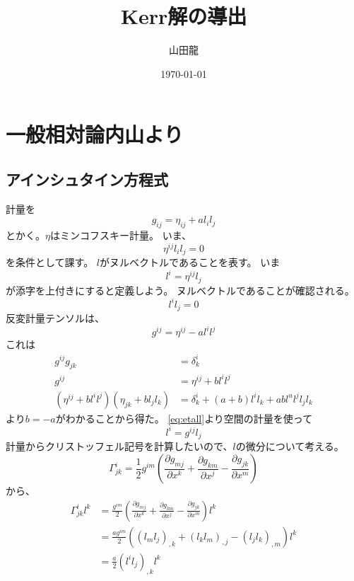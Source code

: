 \documentclass[twocolumn]{jsarticle}
\date{\today}
\author{山田龍}
\title{Kerr解の導出}
\newcommand{\pder}[2][]{\frac{\partial#1}{\partial#2}}
\newcommand{\pderx}[2][]{\pder[#1]{x^{#2}}}
\newcommand{\pdergx}[2][]{\pderx[g_{#1}]{#2}}
\newcommand{\half}{\frac{1}{2}}
\newcommand{\beq}{\begin{equation}}
\newcommand{\eeq}{\end{equation}}
\newcommand{\GaT}[3]{\Gamma^{#1}_{#2 #3}}
\newcommand{\Christfinside}[3]{\pdergx[#3 #1]{#2} + \pdergx[#2 #3]{#1} - \pdergx[#1 #2]{#3}}
\newcommand{\Christf}[4]{\Gamma^{#1}_{#2 #3}=\half g^{#1 #4}(\Christfinside{#2}{#3}{#4})}
\begin{document}
\maketitle
\section{一般相対論内山より}
\subsection{アインシュタイン方程式}
計量を
\beq
g_{ij} = \eta_{ij} + al_il_j
\eeq
とかく。$\eta$はミンコフスキー計量。
いま、
\beq\label{eq:etall}
    \eta^{ij} l_il_j = 0
\eeq
を条件として課す。
$l$がヌルベクトルであることを表す。
いま
\beq
l^i = \eta^{ij}l_j
\eeq
が添字を上付きにすると定義しよう。
ヌルベクトルであることが確認される。
\beq
    l^il_j = 0
\eeq
反変計量テンソルは、
\beq
g^{ij} = \eta^{ij} - al^il^j
\eeq
これは
\begin{align}
    g^{ij}g_{jk} &= \delta^i_k\\
    g^{ij} &= \eta^{ij} + bl^il^j\\
    (\eta^{ij} + bl^il^j)(\eta_{jk} + bl_jl_k) &= \delta^i_k + (a + b)l^il_k + abl^ul^jl_jl_k
\end{align}
より$b = -a$がわかることから得た。
\eqref{eq:etall}より空間の計量を使って
\beq
 l^i = g^{ij}l_j 
\eeq
計量からクリストッフェル記号を計算したいので、$l$の微分について考える。
\beq
\Christf{i}{j}{k}{m}
\eeq
から、
\begin{align}
    \GaT{i}{j}{k}l^k &= \frac{g^{im}}{2}(\Christfinside{j}{k}{m})l^k\\
                     &= \frac{ag^{im}}{2}((l_ml_j)_{,k} + (l_kl_m)_{,j} - (l_jl_k)_{,m})l^k\\
                     &= \frac{a}{2}(l^il_j)_{,k}l^k
\end{align}
\end{document}
